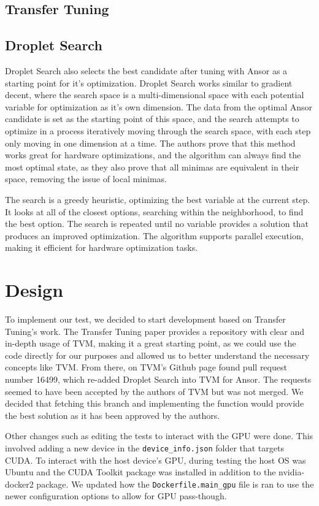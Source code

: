 \documentclass[conference]{IEEEtran}
\begin{document}
\cite{pytorch2}

\subsection{Transfer Tuning}


\subsection{Droplet Search}
Droplet Search also selects the best candidate after tuning with Ansor as a starting point for it's optimization. Droplet Search works similar to gradient decent, where the search space is a multi-dimensional space with each potential variable for optimization as it's own dimension. The data from the optimal Ansor candidate is set as the starting point of this space, and the search attempts to optimize in a process iteratively moving through the search space, with each step only moving in one dimension at a time. The authors prove that this method works great for hardware optimizations, and the algorithm can always find the most optimal state, as they also prove that all minimas are equivalent in their space, removing the issue of local minimas. 

The search is a greedy heuristic, optimizing the best variable at the current step. It looks at all of the closest options, searching within the neighborhood, to find the best option. The search is repeated until no variable provides a solution that produces an improved optimization. The algorithm supports parallel execution, making it efficient for hardware optimization tasks.

\section{Design}
To implement our test, we decided to start development based on Transfer Tuning's work. The Transfer Tuning paper provides a repository with clear and in-depth usage of TVM, making it a great starting point, as we could use the code directly for our purposes and allowed us to better understand the necessary concepts like TVM. From there, on TVM's Github page found pull request number 16499, which re-added Droplet Search into TVM for Ansor. The requests seemed to have been accepted by the authors of TVM but was not merged. We decided that fetching this branch and implementing the function would provide the best solution as it has been approved by the authors.

Other changes such as editing the tests to interact with the GPU were done. This involved adding a new device in the \lstinline{device_info.json} folder that targets CUDA. To interact with the host device's GPU, during testing the host OS was Ubuntu and the CUDA Toolkit package was installed in addition to the nvidia-docker2 package. We updated how the \lstinline{Dockerfile.main_gpu} file is ran to use the newer configuration options to allow for GPU pass-though. 
\end{document}
